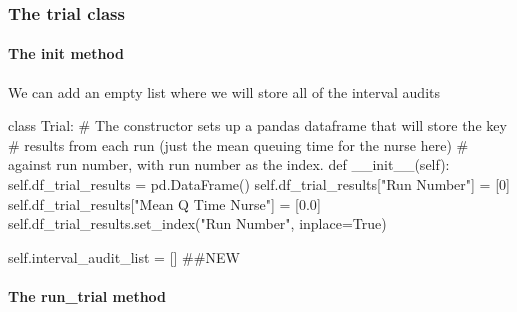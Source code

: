 \documentclass[
  letterpaper,
  DIV=11,
  numbers=noendperiod]{scrreprt}
\let\oldparagraph\paragraph
\renewcommand{\paragraph}[1]{\oldparagraph{#1}\mbox{}}
\newenvironment{Shaded}{}{}
\newcommand{\CommentTok}[1]{\textcolor[rgb]{0.42,0.45,0.49}{#1}}
\newcommand{\DecValTok}[1]{\textcolor[rgb]{0.00,0.36,0.77}{#1}}
\newcommand{\FloatTok}[1]{\textcolor[rgb]{0.00,0.36,0.77}{#1}}
\newcommand{\FunctionTok}[1]{\textcolor[rgb]{0.44,0.26,0.76}{#1}}
\newcommand{\KeywordTok}[1]{\textcolor[rgb]{0.84,0.23,0.29}{#1}}
\newcommand{\NormalTok}[1]{\textcolor[rgb]{0.14,0.16,0.18}{#1}}
\newcommand{\OperatorTok}[1]{\textcolor[rgb]{0.14,0.16,0.18}{#1}}
\newcommand{\StringTok}[1]{\textcolor[rgb]{0.01,0.18,0.38}{#1}}
\newcommand{\VariableTok}[1]{\textcolor[rgb]{0.89,0.38,0.04}{#1}}
\begin{document}
\subsubsection{The trial class}\label{the-trial-class-8}

\paragraph{\texorpdfstring{The \textbf{init}
method}{The init method}}\label{the-init-method-9}

We can add an empty list where we will store all of the interval audits

\begin{Shaded}
\begin{Highlighting}[]
\KeywordTok{class}\NormalTok{ Trial:}
    \CommentTok{\# The constructor sets up a pandas dataframe that will store the key}
    \CommentTok{\# results from each run (just the mean queuing time for the nurse here)}
    \CommentTok{\# against run number, with run number as the index.}
    \KeywordTok{def}  \FunctionTok{\_\_init\_\_}\NormalTok{(}\VariableTok{self}\NormalTok{):}
        \VariableTok{self}\NormalTok{.df\_trial\_results }\OperatorTok{=}\NormalTok{ pd.DataFrame()}
        \VariableTok{self}\NormalTok{.df\_trial\_results[}\StringTok{"Run Number"}\NormalTok{] }\OperatorTok{=}\NormalTok{ [}\DecValTok{0}\NormalTok{]}
        \VariableTok{self}\NormalTok{.df\_trial\_results[}\StringTok{"Mean Q Time Nurse"}\NormalTok{] }\OperatorTok{=}\NormalTok{ [}\FloatTok{0.0}\NormalTok{]}
        \VariableTok{self}\NormalTok{.df\_trial\_results.set\_index(}\StringTok{"Run Number"}\NormalTok{, inplace}\OperatorTok{=}\VariableTok{True}\NormalTok{)}

        \VariableTok{self}\NormalTok{.interval\_audit\_list }\OperatorTok{=}\NormalTok{ [] }\CommentTok{\#\#NEW}
\end{Highlighting}
\end{Shaded}

\paragraph{The run\_trial method}\label{the-run_trial-method-4}
\end{document}
